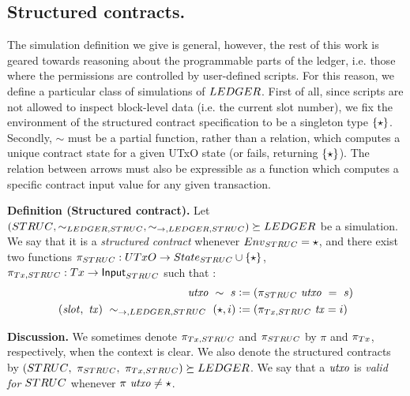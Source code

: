 \subsection{Structured contracts.}
\label{sec:struc-def}

The simulation definition we give is general, however, the rest of this work is
geared towards reasoning about the programmable
parts of the ledger, i.e. those where the permissions are controlled by user-defined
scripts. For this reason, we define a particular class of simulations of $\LEDGER$.
First of all, since scripts are not allowed to inspect block-level data (i.e. the
current slot number), we fix the environment of the structured contract specification
to be a singleton type $\{\star\}$. Secondly, $\sim$ must be a
partial function, rather than a relation, which computes a unique contract state
for a given UTxO state (or fails, returning $\{\star\}$). The
relation between arrows must also be expressible as a function which
computes a specific contract input value for any given transaction.

\textbf{Definition (Structured contract).}
Let
$(\STRUC, \sim_{\LEDGER,\STRUC}, \sim_{\to,\LEDGER,\STRUC}) \succeq \LEDGER$
be a simulation. We say that it is a \emph{structured contract} whenever
$\Env_{\STRUC} = \emptytype$, and there exist
two functions $\pi_{\STRUC} : \UTxO \to \State_{\STRUC} \cup \emptytypeT$,
$\pi_{\Tx,\STRUC} : \Tx \to \Input_{\STRUC}$ such that :
\begin{align*}
  \var{utxo}~\sim~s &\leteq (\pi_{\STRUC}~\var{utxo} ~=~s) \\
  (\var{slot},~\var{tx})~\sim_{\to,\LEDGER,\STRUC}~ (\emptytype, i) &\leteq (\pi_{\Tx,\STRUC}~\var{tx} = i)
\end{align*}

\textbf{Discussion. }
We sometimes denote $\pi_{\Tx,\STRUC}$ and $\pi_{\STRUC}$
by $\pi$ and $\pi_{\Tx}$, respectively, when the context is clear.
We also denote the structured contracts by $(\STRUC,~\pi_{\STRUC},~\pi_{\Tx,\STRUC}) \succeq \LEDGER$.
We say that a $\mathit{utxo}$ is \emph{valid for $\STRUC$} whenever $\pi~\mathit{utxo} \neq \star$.

